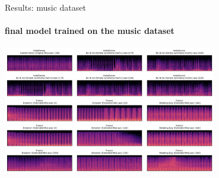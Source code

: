 \documentclass[aspectratio=169, professionalfonts]{beamer}
\begin{document}
\begin{frame}{Results: music dataset}
    \framesubtitle{final model trained on the music dataset}
    
    \centering
    \includegraphics[width=0.7\textwidth,keepaspectratio]{images/Walk_through_music_space.png}
    
\end{frame}

\end{document}
